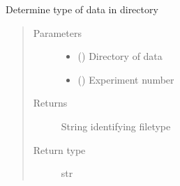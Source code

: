 \documentclass[letterpaper,10pt,english]{sphinxmanual}
\begin{document}

\begin{fulllineitems}
\label{\detokenize{dnpImport:dnpLab.dnpImport.topspin.dir_data_type}}
Determine type of data in directory
\begin{quote}\begin{description}
\item[{Parameters}] \leavevmode\begin{itemize}
\item {} 
 () \sphinxhyphen{}\sphinxhyphen{} Directory of data

\item {} 
 () \sphinxhyphen{}\sphinxhyphen{} Experiment number

\end{itemize}

\item[{Returns}] \leavevmode
String identifying filetype

\item[{Return type}] \leavevmode
str

\end{description}\end{quote}

\end{fulllineitems}

\end{document}
